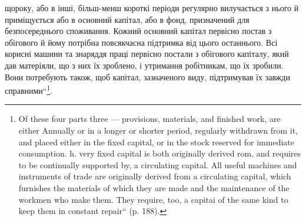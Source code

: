 \parcont{}  %
щороку, або в інші, більш-менш короткі періоди регулярно вилучається
з нього й приміщується або в основний капітал, або в фонд, призначений
для безпосереднього споживання. Кожний основний капітал первісно
постав з обігового й йому потрібна повсякчасна підтримка від цього
останнього. Всі корисні машини та знаряддя праці первісно постали з
обігового капіталу, який дав матеріяли, що з них їх зроблено, і утримання
робітникам, що їх зробили. Вони потребують також, щоб капітал,
зазначеного виду, підтримував їх завжди справними“\footnote*{
Of these four parts three — provisions, materials, and finished work, are either
Annually or in a longer or shorter period, regularly withdrawn from it, and placed
either in the fixed capital, or in the stock reserved for immediate consumption.
h. very fixed capital is both originally derived rom, and requires to be continually
supported by, a circulating capital. All useful machines and instruments of trade are
originally derived from a circulating capital, which furnishes the materials of which
they are made and the maintenance of the workmen who make them. They require,
too, a capitai of the same kind to keep them in constant repair“ (p. 188).
}.

